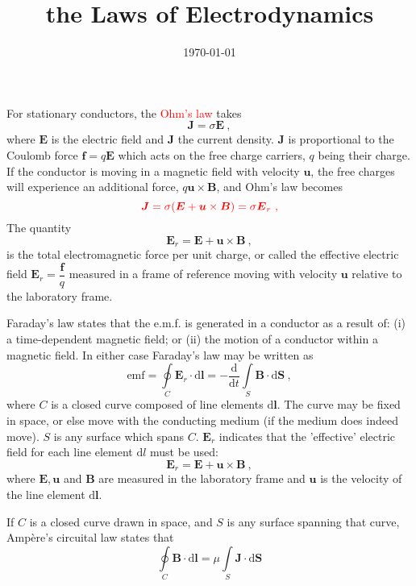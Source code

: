 \documentclass[12pt,a4paper]{article}
\title{the Laws of Electrodynamics}
\author{}
\date{\today}
\renewcommand{\vec}[1]{\boldsymbol{#1}}
\newcommand{\dif}{\mathrm{d}}
\begin{document}
\maketitle

\cite{2001imhd.book.....D} For stationary conductors, the \textcolor{red}{Ohm's law} takes
\begin{equation*}
\vec{J} =  \sigma \vec{E} ~,
\end{equation*}
where $\vec{E}$ is the electric field and $\vec{J}$ the current density. $\vec{J}$ is proportional to the Coulomb force $\vec{f} = q \vec{E}$ which acts on the free charge carriers, $q$ being their charge. If the conductor is moving in a magnetic field with velocity $\vec{u}$, the free charges will experience an additional force, $q \vec{u} \times \vec{B}$, and Ohm's law becomes
\begin{equation*}
\color{red} \vec{J} =  \sigma (\vec{E} + \vec{u} \times \vec{B}) = \sigma \vec{E}_r ~,
\end{equation*}
The quantity  
\begin{equation}
\vec{E}_r = \vec{E} + \vec{u} \times \vec{B} ~, 
\end{equation}
is the total electromagnetic force per unit charge, or called the effective electric field $\vec{E}_r = \dfrac{\vec{f} }{q}$ measured in a frame of reference moving with velocity $\vec{u}$ relative to the laboratory frame. 

Faraday's law states that the e.m.f. is generated in a conductor as a result of: (i) a time-dependent magnetic field; or (ii) the motion of a conductor within a magnetic field. In either case Faraday's law may be written as
\begin{equation*}
\text{emf} = \oint\limits_C \vec{E}_r \cdot \dif \vec{l} = -\frac{\dif }{\dif t} \int\limits_S  \vec{B} \cdot \dif \vec{S} ~,
\end{equation*}
where $C$ is a closed curve composed of line elements $\dif \vec{l}$. The curve may be fixed in space, or else move with the conducting medium (if the medium does indeed move). $S$ is any surface which spans $C$. $\vec{E}_r$ indicates that the 'effective' electric field for each line element $\dif l$ must be used:
\begin{equation}
\vec{E}_r = \vec{E} + \vec{u} \times \vec{B} ~, 
\end{equation}
where $\vec{E}, \vec{u}$ and $\vec{B}$ are measured in the laboratory frame and $\vec{u}$ is the velocity of the line element $\dif \vec{l}$.

If $C$ is a closed curve drawn in space, and $S$ is any surface spanning that curve, Amp\`ere's circuital law states that
\begin{equation}
\oint\limits_C \vec{B} \cdot \dif \vec{l} = \mu \int\limits_S \vec{J} \cdot \dif \vec{S} 
\end{equation}
\end{document}

